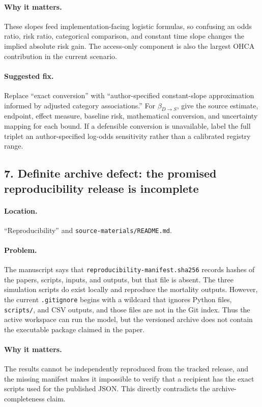 \documentclass[11pt]{article}
\begin{document}
\paragraph{Why it matters.}
These slopes feed implementation-facing logistic formulas, so confusing an
odds ratio, risk ratio, categorical comparison, and constant time slope changes
the implied absolute risk gain.  The access-only component is also the largest
OHCA contribution in the current scenario.

\paragraph{Suggested fix.}
Replace ``exact conversion'' with ``author-specified constant-slope
approximation informed by adjusted category associations.''  For
$\beta_{D\to S}$, give the source estimate, endpoint, effect measure, baseline
risk, mathematical conversion, and uncertainty mapping for each bound.  If a
defensible conversion is unavailable, label the full triplet an
author-specified log-odds sensitivity rather than a calibrated registry range.

\subsection*{7. Definite archive defect: the promised reproducibility release is incomplete}

\paragraph{Location.}
``Reproducibility'' and \texttt{source-materials/README.md}.

\paragraph{Problem.}
The manuscript says that
\texttt{reproducibility-manifest.sha256} records hashes of the papers, scripts,
inputs, and outputs, but that file is absent.  The three simulation scripts do
exist locally and reproduce the mortality outputs.  However, the current
\texttt{.gitignore} begins with a wildcard that ignores Python files,
\texttt{scripts/}, and CSV outputs, and those files are not in the Git index.
Thus the active workspace can run the model, but the versioned archive does not
contain the executable package claimed in the paper.

\paragraph{Why it matters.}
The results cannot be independently reproduced from the tracked release, and
the missing manifest makes it impossible to verify that a recipient has the
exact scripts used for the published JSON.  This directly contradicts the
archive-completeness claim.
\end{document}
